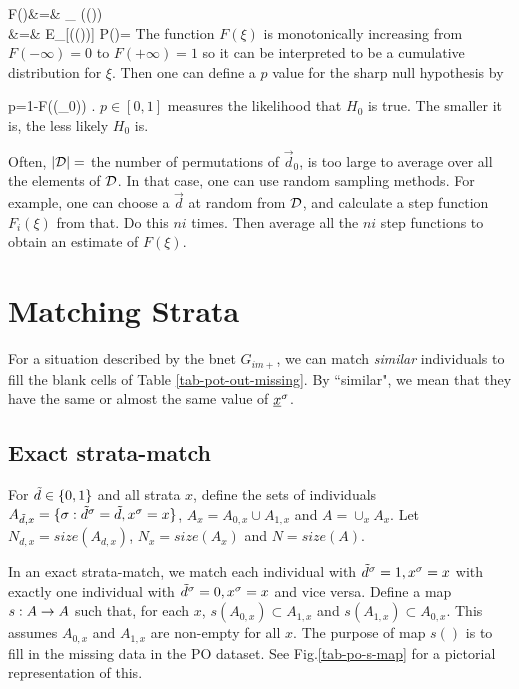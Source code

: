 \beqa
F(\xi)&=&
\sum_{\in \cald}
\indi(\xi()\leq \xi)
\\
&=&
E_{}[\indi(\xi()\leq \xi)]\;\;\;
P()=
\eeqa
The function $F(\xi)$ is monotonically 
increasing
from $F(-\infty)=0$ to $F(+\infty)=1$
so it can be interpreted to be a cumulative
distribution for $\xi$. Then one can
define a $p$ value
for the sharp null
hypothesis by

\beq
p=1-F(\xi(_0))
\;.
\eeq
$p\in[0,1]$ measures the 
likelihood that $H_0$ is true. The smaller it is, 
the less likely $H_0$ is.

Often, $|{\cal D}|=$ 
the number of permutations of $\vec{d}_0$,
is too large to average over all 
the elements of ${\cal D}$. In that
case, one can use random sampling methods.
For example, one can choose a $\vec{d}$
at random
from ${\cal D}$, 
and calculate a step function $F_i(\xi)$
from that. Do this $ni$ times. Then
average all the $ni$ step functions
to obtain an estimate of $F(\xi)$.


\section{Matching Strata}

For a situation
described by
the bnet $G_{im+}$,
we can match {\it similar}
individuals to fill the blank cells of
 Table \ref{tab-pot-out-missing}.
By ``similar", we mean that
they have the same or almost the same
value of ${\underline{x}}^\sigma$.


\subsection{Exact strata-match}

For ${\tilde{d}}\in \{0,1\}$ and all strata $x$,
define the sets of individuals
$A_{{\tilde{d}},x}=\{\sigma: {\tilde{d}}^\sigma={\tilde{d}}, x^\sigma=x\}$,
$A_x=A_{0,x}\cup A_{1,x}$ and $A=\cup_x A_x$.
Let $N_{d,x}=size(A_{d,x})$,
$N_x= size(A_x)$ and $N=size(A)$.

In an exact strata-match,
we match each individual with
${\tilde{d}}^\sigma=1, x^\sigma=x$
with
exactly
one individual
with ${\tilde{d}}^\sigma=0, x^\sigma=x$
and vice versa.
Define a map $s:A\rightarrow A$
such that,
for each $x$,
$s(A_{0,x})\subset A_{1,x}$ and
$s(A_{1,x})\subset A_{0,x}$.
This assumes $A_{0,x}$ and $A_{1,x}$
are non-empty for all $x$.
The purpose of map $s()$
is
to fill in the missing data in the
PO dataset. See Fig.\ref{tab-po-s-map}
for a pictorial representation of 
this.

